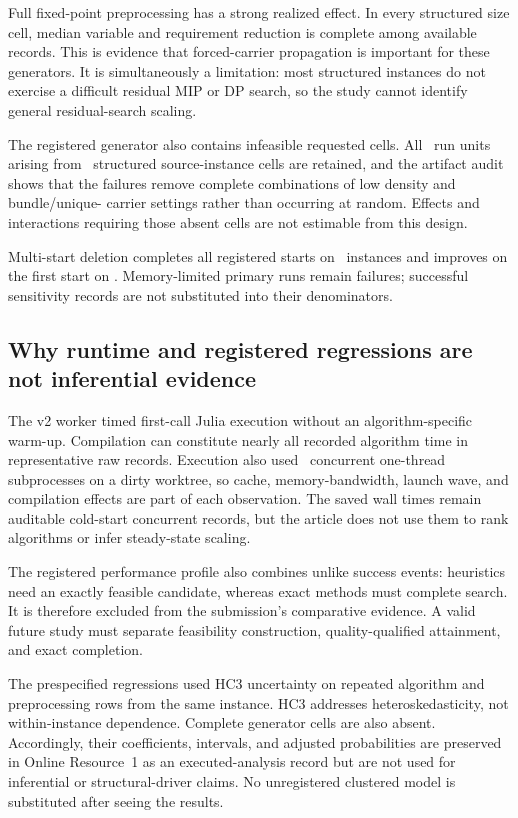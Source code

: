 Full fixed-point preprocessing has a strong realized effect. In every
structured size cell, median variable and requirement reduction is complete
among available records. This is evidence that forced-carrier propagation is
important for these generators. It is simultaneously a limitation: most
structured instances do not exercise a difficult residual MIP or DP search, so
the study cannot identify general residual-search scaling.

\AORPreprocessingMultistartTable

The registered generator also contains infeasible requested cells. All
\AORGenerationFailed\ run units arising from
\AORGenerationFailedInstances\ structured source-instance cells are retained,
and the artifact audit shows that
the failures remove complete combinations of low density and bundle/unique-
carrier settings rather than occurring at random. Effects and interactions
requiring those absent cells are not estimable from this design.

Multi-start deletion completes all registered starts on
\AORMultistartComplete\ instances and improves on the first start on
\AORMultistartImproved. Memory-limited primary runs remain failures; successful
sensitivity records are not substituted into their denominators.

\subsection{Why runtime and registered regressions are not inferential evidence}

The v2 worker timed first-call Julia execution without an algorithm-specific
warm-up. Compilation can constitute nearly all recorded algorithm time in
representative raw records. Execution also used \AORWorkerCount\ concurrent
one-thread subprocesses on a dirty worktree, so cache, memory-bandwidth, launch
wave, and compilation effects are part of each observation. The saved wall
times remain auditable cold-start concurrent records, but the article does not
use them to rank algorithms or infer steady-state scaling.

The registered performance profile also combines unlike success events:
heuristics need an exactly feasible candidate, whereas exact methods must
complete search. It is therefore excluded from the submission's comparative
evidence. A valid future study must separate feasibility construction,
quality-qualified attainment, and exact completion.

The prespecified regressions used HC3 uncertainty on repeated algorithm and
preprocessing rows from the same instance. HC3 addresses heteroskedasticity,
not within-instance dependence. Complete generator cells are also absent.
Accordingly, their coefficients, intervals, and adjusted probabilities are
preserved in Online Resource~1 as an executed-analysis record but are not used
for inferential or structural-driver claims. No unregistered clustered model is
substituted after seeing the results.

